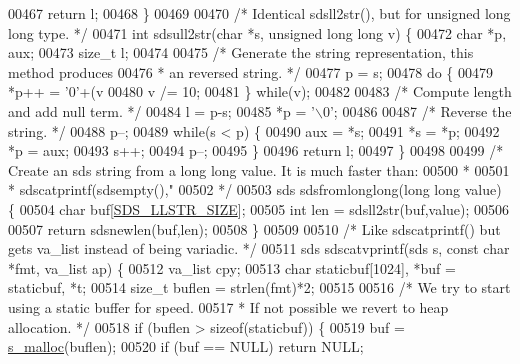 \begin{DoxyCode}
{00467     \textcolor{keywordflow}{return} l;
00468 \}
00469 
00470 \textcolor{comment}{/* Identical sdsll2str(), but for unsigned long long type. */}
00471 \textcolor{keywordtype}{int} sdsull2str(\textcolor{keywordtype}{char} *s, \textcolor{keywordtype}{unsigned} \textcolor{keywordtype}{long} \textcolor{keywordtype}{long} v) \{
00472     \textcolor{keywordtype}{char} *p, aux;
00473     size\_t l;
00474 
00475     \textcolor{comment}{/* Generate the string representation, this method produces}
00476 \textcolor{comment}{     * an reversed string. */}
00477     p = s;
00478     \textcolor{keywordflow}{do} \{
00479         *p++ = \textcolor{stringliteral}{'0'}+(v%
00480         v /= 10;
00481     \} \textcolor{keywordflow}{while}(v);
00482 
00483     \textcolor{comment}{/* Compute length and add null term. */}
00484     l = p-s;
00485     *p = \textcolor{stringliteral}{'\(\backslash\)0'};
00486 
00487     \textcolor{comment}{/* Reverse the string. */}
00488     p--;
00489     \textcolor{keywordflow}{while}(s < p) \{
00490         aux = *s;
00491         *s = *p;
00492         *p = aux;
00493         s++;
00494         p--;
00495     \}
00496     \textcolor{keywordflow}{return} l;
00497 \}
00498 
00499 \textcolor{comment}{/* Create an sds string from a long long value. It is much faster than:}
00500 \textcolor{comment}{ *}
00501 \textcolor{comment}{ * sdscatprintf(sdsempty(),"%
00502 \textcolor{comment}{ */}
00503 sds sdsfromlonglong(\textcolor{keywordtype}{long} \textcolor{keywordtype}{long} value) \{
00504     \textcolor{keywordtype}{char} buf[\hyperlink{sds_8c_a81d5c6a677fb9cb9b5fb37fba6a2612d}{SDS\_LLSTR\_SIZE}];
00505     \textcolor{keywordtype}{int} len = sdsll2str(buf,value);
00506 
00507     \textcolor{keywordflow}{return} sdsnewlen(buf,len);
00508 \}
00509 
00510 \textcolor{comment}{/* Like sdscatprintf() but gets va\_list instead of being variadic. */}
00511 sds sdscatvprintf(sds s, \textcolor{keyword}{const} \textcolor{keywordtype}{char} *fmt, va\_list ap) \{
00512     va\_list cpy;
00513     \textcolor{keywordtype}{char} staticbuf[1024], *buf = staticbuf, *t;
00514     size\_t buflen = strlen(fmt)*2;
00515 
00516     \textcolor{comment}{/* We try to start using a static buffer for speed.}
00517 \textcolor{comment}{     * If not possible we revert to heap allocation. */}
00518     \textcolor{keywordflow}{if} (buflen > \textcolor{keyword}{sizeof}(staticbuf)) \{
00519         buf = \hyperlink{sdsalloc_8h_a41e8c1188dca30db85c410c25fb417b6}{s\_malloc}(buflen);
00520         \textcolor{keywordflow}{if} (buf == NULL) \textcolor{keywordflow}{return} NULL;
}}
\end{DoxyCode}

